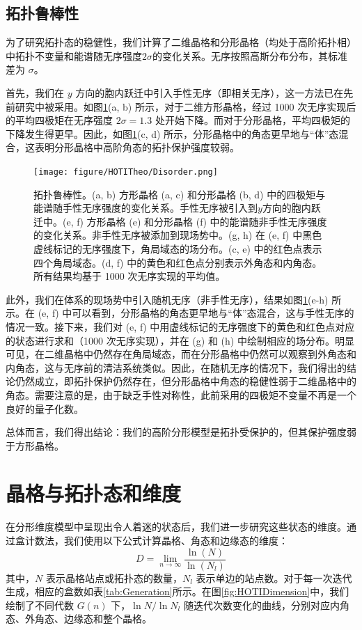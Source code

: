 \subsection{拓扑鲁棒性}
为了研究拓扑态的稳健性，我们计算了二维晶格和分形晶格（均处于高阶拓扑相）中拓扑不变量和能谱随无序强度$ 2\sigma $的变化关系。无序按照高斯分布分布，其标准差为 $ \sigma $。

首先，我们在 $ y $ 方向的胞内跃迁中引入手性无序（即相关无序），这一方法已在先前研究中被采用\cite{li2020topological}。如图\ref{fig:Disorder}(a, b) 所示，对于二维方形晶格，经过 1000 次无序实现后的平均四极矩在无序强度 \( 2\sigma = 1.3 \) 处开始下降。而对于分形晶格，平均四极矩的下降发生得更早。因此，如图\ref{fig:Disorder}(c, d) 所示，分形晶格中的角态更早地与“体”态混合，这表明分形晶格中高阶角态的拓扑保护强度较弱。

\begin{figure}[htbp]
    \centering
    \texttt{[image: figure/HOTITheo/Disorder.png]}
    \caption{拓扑鲁棒性。(a, b) 方形晶格 (a, c) 和分形晶格 (b, d) 中的四极矩与能谱随手性无序强度的变化关系。手性无序被引入到$y$方向的胞内跃迁中。(e, f) 方形晶格 (e) 和分形晶格 (f) 中的能谱随非手性无序强度的变化关系。非手性无序被添加到现场势中。(g, h) 在 (e, f) 中黑色虚线标记的无序强度下，角局域态的场分布。(c, e) 中的红色点表示四个角局域态。(d, f) 中的黄色和红色点分别表示外角态和内角态。所有结果均基于 1000 次无序实现的平均值。}
    \label{fig:Disorder}
\end{figure}

此外，我们在体系的现场势中引入随机无序（非手性无序），结果如图\ref{fig:Disorder}(e-h) 所示。在 (e, f) 中可以看到，分形晶格的角态更早地与“体”态混合，这与手性无序的情况一致。接下来，我们对 (e, f) 中用虚线标记的无序强度下的黄色和红色点对应的状态进行求和（1000 次无序实现），并在 (g) 和 (h) 中绘制相应的场分布。明显可见，在二维晶格中仍然存在角局域态，而在分形晶格中仍然可以观察到外角态和内角态，这与无序前的清洁系统类似。因此，在随机无序的情况下，我们得出的结论仍然成立，即拓扑保护仍然存在，但分形晶格中角态的稳健性弱于二维晶格中的角态。需要注意的是，由于缺乏手性对称性，此前采用的四极矩不变量不再是一个良好的量子化数\cite{li2020topological}。

总体而言，我们得出结论：我们的高阶分形模型是拓扑受保护的，但其保护强度弱于方形晶格。

\section{晶格与拓扑态和维度}
在分形维度模型中呈现出令人着迷的状态后，我们进一步研究这些状态的维度。通过盒计数法\cite{Mandelbrot1982}，我们使用以下公式计算晶格、角态和边缘态的维度：
\begin{equation}
D = \lim_{n \to \infty} \frac{\ln (N)}{\ln (N_l)}
\label{eq:BoxCounting}
\end{equation}
其中，\( N \) 表示晶格站点或拓扑态的数量，\( N_l \) 表示单边的站点数。对于每一次迭代生成，相应的盒数如表\ref{tab:Generation}所示。在图\ref{fig:HOTIDimension}中，我们绘制了不同代数 \( G(n) \) 下，\( \ln N / \ln N_l \) 随迭代次数变化的曲线，分别对应内角态、外角态、边缘态和整个晶格。

